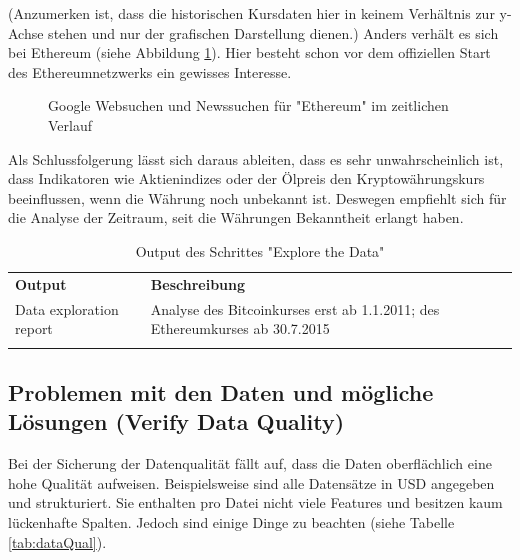 (Anzumerken ist, dass die historischen Kursdaten hier in keinem Verhältnis zur y-Achse stehen und nur der grafischen Darstellung dienen.)
Anders verhält es sich bei Ethereum (siehe Abbildung \ref{fig:PublicInterestETH}). Hier besteht schon vor dem offiziellen Start des Ethereumnetzwerks\citep{tual_ethereum_2015} ein gewisses Interesse.
\begin{figure}[H]
\centering
{}
\caption{Google Websuchen und Newssuchen für "Ethereum" im zeitlichen Verlauf}
\label{fig:PublicInterestETH}
\end{figure}
Als Schlussfolgerung lässt sich daraus ableiten, dass es sehr unwahrscheinlich ist, dass Indikatoren wie Aktienindizes oder der Ölpreis den Kryptowährungskurs beeinflussen, wenn die Währung noch unbekannt ist. Deswegen empfiehlt sich für die Analyse der Zeitraum, seit die Währungen Bekanntheit erlangt haben. 

\begin{centering} \begin{longtable}[H]{|p{}|p{12cm}|}
\hline
\textbf{Output} & \textbf{Beschreibung} \\ 
\hhline{==}
Data exploration report & Analyse des Bitcoinkurses erst ab 1.1.2011; des Ethereumkurses ab 30.7.2015\\
\hline
\caption{Output des Schrittes "Explore the Data"}
\end{longtable} \end{centering}

\subsection{Problemen mit den Daten und mögliche Lösungen (Verify Data Quality)}
Bei der Sicherung der Datenqualität fällt auf, dass die Daten oberflächlich eine hohe Qualität aufweisen. Beispielsweise sind alle Datensätze in USD angegeben und strukturiert. Sie enthalten pro Datei nicht viele Features und besitzen kaum lückenhafte Spalten. Jedoch sind einige Dinge zu beachten (siehe Tabelle \ref{tab:dataQual}).

